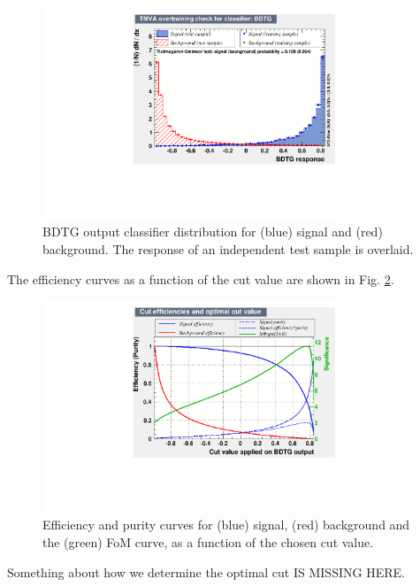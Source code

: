 \begin{figure}[h]
\includegraphics[height=9.cm,width=0.80\textwidth]{figs/BDT_Response.pdf}
\caption{BDTG output classifier distribution for (blue) signal and (red) background. The response of an independent test sample is overlaid.}
\label{fig:BDT_Response}
\end{figure}


The efficiency curves as a function of the cut value are shown in Fig. \ref{fig:BDT_Efficiency}.

\begin{figure}[h]
\includegraphics[height=9.cm,width=0.80\textwidth]{figs/BDT_CutEfficiency.pdf}
\caption{Efficiency and purity curves for (blue) signal, (red) background and the (green) FoM curve, as a function of the chosen cut value.}
\label{fig:BDT_Efficiency}
\end{figure}       


Something about how we determine the optimal cut IS MISSING HERE.
